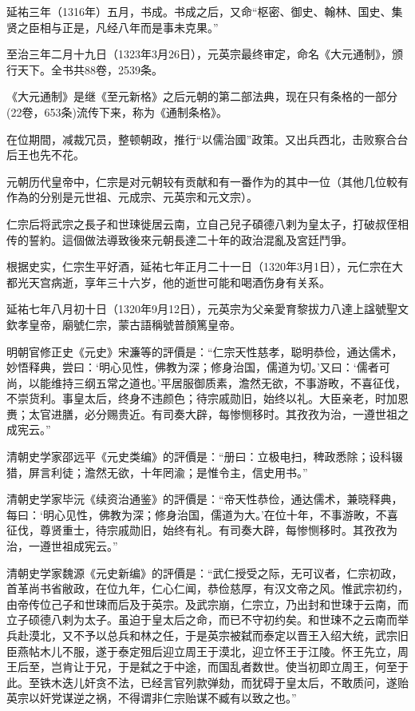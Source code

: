 延祐三年（1316年）五月，书成。书成之后，又命“枢密、御史、翰林、国史、集贤之臣相与正是，凡经八年而是事未克果。”

至治三年二月十九日（1323年3月26日），元英宗最终审定，命名《大元通制》，颁行天下。全书共88卷，2539条。

《大元通制》是继《至元新格》之后元朝的第二部法典，现在只有条格的一部分(22卷，653条)流传下来，称为《通制条格》。

在位期間，减裁冗员，整顿朝政，推行“以儒治國”政策。又出兵西北，击败察合台后王也先不花。

元朝历代皇帝中，仁宗是对元朝较有贡献和有一番作为的其中一位（其他几位較有作為的分别是元世祖、元成宗、元英宗和元文宗）。

仁宗后将武宗之長子和世㻋徙居云南，立自己兒子碩德八剌为皇太子，打破叔侄相传的誓約。這個做法導致後來元朝長達二十年的政治混亂及宮廷鬥爭。

根据史实，仁宗生平好酒，延祐七年正月二十一日（1320年3月1日），元仁宗在大都光天宫病逝，享年三十六岁，他的逝世可能和喝酒伤身有关系。

延祐七年八月初十日（1320年9月12日），元英宗为父亲愛育黎拔力八達上諡號聖文欽孝皇帝，廟號仁宗，蒙古語稱號普顏篤皇帝。

明朝官修正史《元史》宋濂等的評價是：“仁宗天性慈孝，聪明恭俭，通达儒术，妙悟释典，尝曰：‘明心见性，佛教为深；修身治国，儒道为切。’又曰：‘儒者可尚，以能维持三纲五常之道也。’平居服御质素，澹然无欲，不事游畋，不喜征伐，不崇货利。事皇太后，终身不违颜色；待宗戚勋旧，始终以礼。大臣亲老，时加恩赉；太官进膳，必分赐贵近。有司奏大辟，每惨恻移时。其孜孜为治，一遵世祖之成宪云。”

清朝史学家邵远平《元史类编》的評價是：“册曰：立极电扫，稗政悉除；设科辍猎，屏言利徒；澹然无欲，十年罔渝；是惟令主，信史用书。”

清朝史学家毕沅《续资治通鉴》的評價是：“帝天性恭俭，通达儒术，兼晓释典，每曰：‘明心见性，佛教为深；修身治国，儒道为大。’在位十年，不事游畋，不喜征伐，尊贤重士，待宗戚勋旧，始终有礼。有司奏大辟，每惨恻移时。其孜孜为治，一遵世祖成宪云。”

清朝史学家魏源《元史新编》的評價是：“武仁授受之际，无可议者，仁宗初政，首革尚书省敝政，在位九年，仁心仁闻，恭俭慈厚，有汉文帝之风。惟武宗初约，由帝传位己子和世㻋而后及于英宗。及武宗崩，仁宗立，乃出封和世㻋于云南，而立子硕德八剌为太子。虽迫于皇太后之命，而已不守初约矣。和世㻋不之云南而举兵赴漠北，又不予以总兵和林之任，于是英宗被弑而泰定以晋王入绍大统，武宗旧臣燕帖木儿不服，遂于泰定殂后迎立周王于漠北，迎立怀王于江陵。怀王先立，周王后至，岂肯让于兄，于是弑之于中途，而国乱者数世。使当初即立周王，何至于此。至铁木迭儿奸贪不法，已经言官列款弹劾，而犹碍于皇太后，不敢质问，遂贻英宗以奸党谋逆之祸，不得谓非仁宗贻谋不臧有以致之也。”

